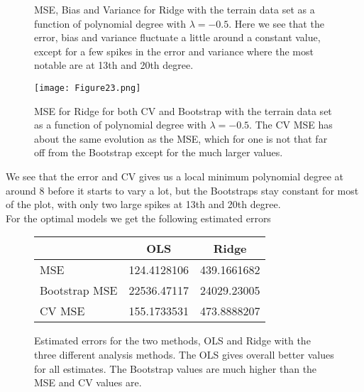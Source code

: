 \documentclass[11pt, A4paper, english]{article}
\begin{document}
\begin{multicols}{2}
\begin{figure}[H]
\caption{MSE, Bias and Variance for Ridge with the terrain data set as a function of polynomial degree with $\lambda = -0.5$. Here we see that the error, bias and variance fluctuate a little around a constant value, except for a few spikes in the error and variance where the most notable are at 13th and 20th degree.}
\label{Bootstrap_Ridge_poly_terrain}
			\end{figure}
			\begin{figure}[H]
\texttt{[image: Figure23.png]}
\caption{MSE for Ridge for both CV and Bootstrap with the terrain data set as a function of polynomial degree with $\lambda = -0.5$. The CV MSE has about the same evolution as the MSE, which for one is not that far off from the Bootstrap except for the much larger values.}
\label{CV_Ridge_poly_terrain}
			\end{figure}
We see that the error and CV gives us a local minimum polynomial degree at around 8 before it starts to vary a lot, but the Bootstraps stay constant for most of the plot, with only two large spikes at 13th and 20th degree. \\
For the optimal models we get the following estimated errors \\
			\begin{figure}[H]
				\begin{tabular}{|l|c|c|}
\hline
& OLS & Ridge \\
\hline
MSE & 124.4128106 & 439.1661682 \\
Bootstrap MSE & 22536.47117 & 24029.23005 \\
CV MSE & 155.1733531 & 473.8888207 \\
\hline
				\end{tabular}
\caption{Estimated errors for the two methods, OLS and Ridge with the three different analysis methods. The OLS gives overall better values for all estimates. The Bootstrap values are much higher than the MSE and CV values are.}
\label{Model_Error_Table}
			\end{figure}



\end{multicols}
\end{document}
